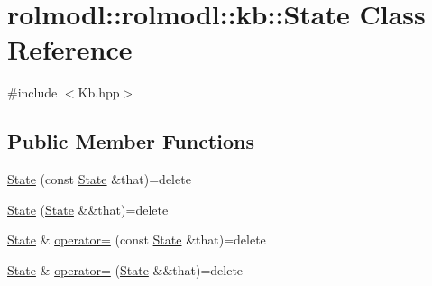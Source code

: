 \hypertarget{classrolmodl_1_1rolmodl_1_1kb_1_1_state}{}\section{rolmodl\+::rolmodl\+::kb\+::State Class Reference}
\label{classrolmodl_1_1rolmodl_1_1kb_1_1_state}


{\ttfamily \#include $<$Kb.\+hpp$>$}

\subsection*{Public Member Functions}
\begin{DoxyCompactItemize}
\item 
\mbox{\hyperlink{classrolmodl_1_1rolmodl_1_1kb_1_1_state_a96ff7ce0855c3266f3224287ef69abc0}{State}} (const \mbox{\hyperlink{classrolmodl_1_1rolmodl_1_1kb_1_1_state}{State}} \&that)=delete
\item 
\mbox{\hyperlink{classrolmodl_1_1rolmodl_1_1kb_1_1_state_a4919afbc212223527ed041bd17955fbc}{State}} (\mbox{\hyperlink{classrolmodl_1_1rolmodl_1_1kb_1_1_state}{State}} \&\&that)=delete
\item 
\mbox{\hyperlink{classrolmodl_1_1rolmodl_1_1kb_1_1_state}{State}} \& \mbox{\hyperlink{classrolmodl_1_1rolmodl_1_1kb_1_1_state_a3070a0ad61332b80ca51b9417ef930fe}{operator=}} (const \mbox{\hyperlink{classrolmodl_1_1rolmodl_1_1kb_1_1_state}{State}} \&that)=delete
\item 
\mbox{\hyperlink{classrolmodl_1_1rolmodl_1_1kb_1_1_state}{State}} \& \mbox{\hyperlink{classrolmodl_1_1rolmodl_1_1kb_1_1_state_a252da6664a569b5812108a885bece888}{operator=}} (\mbox{\hyperlink{classrolmodl_1_1rolmodl_1_1kb_1_1_state}{State}} \&\&that)=delete
\end{DoxyCompactItemize}
